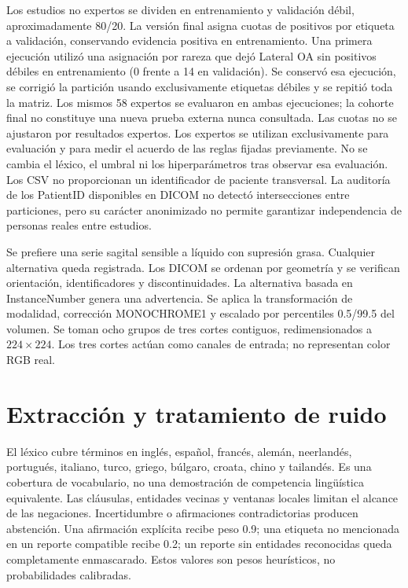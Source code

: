 Los estudios no expertos se dividen en entrenamiento y validación débil, aproximadamente 80/20.
La versión final asigna cuotas de positivos por etiqueta a validación, conservando evidencia positiva
en entrenamiento. Una primera ejecución utilizó una asignación por rareza que dejó Lateral OA
sin positivos débiles en entrenamiento (0 frente a 14 en validación). Se conservó esa ejecución,
se corrigió la partición usando exclusivamente etiquetas débiles y se repitió toda la matriz.
Los mismos 58 expertos se evaluaron en ambas ejecuciones; la cohorte final no constituye
una nueva prueba externa nunca consultada. Las cuotas no se ajustaron por resultados expertos.
Los expertos se utilizan exclusivamente para evaluación y para medir el acuerdo de las reglas fijadas previamente.
No se cambia el léxico, el umbral ni los hiperparámetros tras observar esa evaluación.
Los CSV no proporcionan un identificador de paciente transversal. La auditoría de los PatientID
disponibles en DICOM no detectó intersecciones entre particiones, pero su carácter anonimizado
no permite garantizar independencia de personas reales entre estudios.

Se prefiere una serie sagital sensible a líquido con supresión grasa. Cualquier alternativa queda registrada.
Los DICOM se ordenan por geometría y se verifican orientación, identificadores y discontinuidades.
La alternativa basada en InstanceNumber genera una advertencia.
Se aplica la transformación de modalidad, corrección MONOCHROME1 y escalado por percentiles 0.5/99.5 del volumen.
Se toman ocho grupos de tres cortes contiguos, redimensionados a $224\times224$.
Los tres cortes actúan como canales de entrada; no representan color RGB real.

\section{Extracción y tratamiento de ruido}
El léxico cubre términos en inglés, español, francés, alemán, neerlandés, portugués, italiano,
turco, griego, búlgaro, croata, chino y tailandés. Es una cobertura de vocabulario, no una demostración
de competencia lingüística equivalente. Las cláusulas, entidades vecinas y ventanas locales limitan el alcance
de las negaciones. Incertidumbre o afirmaciones contradictorias producen abstención.
Una afirmación explícita recibe peso 0.9; una etiqueta no mencionada en un reporte compatible recibe 0.2;
un reporte sin entidades reconocidas queda completamente enmascarado.
Estos valores son pesos heurísticos, no probabilidades calibradas.

